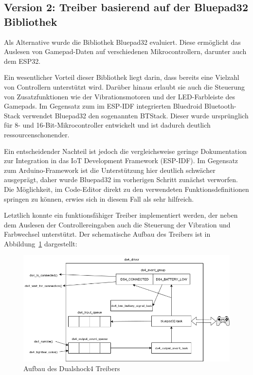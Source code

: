 \subsection{Version 2: Treiber basierend auf der Bluepad32 Bibliothek}

Als Alternative wurde die Bibliothek Bluepad32 evaluiert. Diese ermöglicht das Auslesen von Gamepad-Daten auf verschiedenen Mikrocontrollern, darunter auch dem ESP32.

Ein wesentlicher Vorteil dieser Bibliothek liegt darin, dass bereits eine Vielzahl von Controllern unterstützt wird. 
Darüber hinaus erlaubt sie auch die Steuerung von Zusatzfunktionen wie der Vibrationsmotoren und der LED-Farbleiste des Gamepads. 
Im Gegensatz zum im ESP-IDF integrierten Bluedroid Bluetooth-Stack verwendet Bluepad32 den sogenannten BTStack.
Dieser wurde ursprünglich für 8- und 16-Bit-Mikrocontroller entwickelt und ist dadurch deutlich ressourcenschonender. \cite{BTStack}

Ein entscheidender Nachteil ist jedoch die vergleichsweise geringe Dokumentation zur Integration in das IoT Development Framework (ESP-IDF). 
Im Gegensatz zum Arduino-Framework ist die Unterstützung hier deutlich schwächer ausgeprägt, daher wurde Bluepad32 im vorherigen Schritt zunächst verworfen. 
Die Möglichkeit, im Code-Editor direkt zu den verwendeten Funktionsdefinitionen springen zu können, erwies sich in diesem Fall als sehr hilfreich. \cite{bluepad32}

Letztlich konnte ein funktionsfähiger Treiber implementiert werden, der neben dem Auslesen der Controllereingaben auch die Steuerung der Vibration und Farbwechsel unterstützt.
Der schematische Aufbau des Treibers ist in Abbildung~\ref{fig:ds4_driver} dargestellt:

\begin{figure}[ht]
    \centering
    \includegraphics[width=\textwidth]{images/becker_esp32_ds4_driver.png}
    \caption{Aufbau des Dualshock4 Treibers}
    \label{fig:ds4_driver}
\end{figure}


